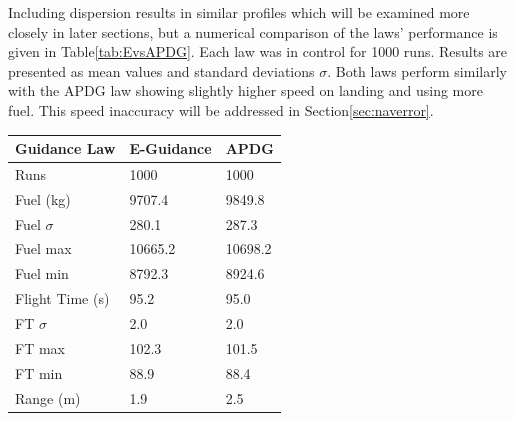 Including dispersion results in similar profiles which will be examined more closely in later sections, but a numerical comparison of the laws' performance is given in Table\:\ref{tab:EvsAPDG}. Each law was in control for 1000 runs. Results are presented as mean values and standard deviations $\sigma$. Both laws perform similarly with the APDG law showing slightly higher speed on landing and using more fuel. This speed inaccuracy will be addressed in Section\:\ref{sec:naverror}.

\begin{table}[H]                                              
	\centering                                                     
	\begin{tabularx}{\textwidth}{@{}lYY@{}}                             
		\toprule                                                         
		\bfseries Guidance Law & \bfseries E-Guidance & \bfseries APDG \\                                 
		\toprule                                                     
	Runs & 1000 & 1000 \\                                      
    		\toprule                                                                                                   
	Fuel (kg) & 9707.4 & 9849.8 \\                              
                                                    
	Fuel $\sigma$ & 280.1 & 287.3 \\                           
                                                 
	Fuel max & 10665.2 & 10698.2 \\                            
                                            
	Fuel min & 8792.3 & 8924.6 \\                              
	\toprule
	Flight Time (s) & 95.2 & 95.0 \\                           

	FT $\sigma$ & 2.0 & 2.0 \\                                 

	FT max & 102.3 & 101.5 \\                                  

	FT min & 88.9 & 88.4 \\                                    
	\toprule
	Range (m) & 1.9 & 2.5 \\                                   


\end{tabularx}
\end{table}
